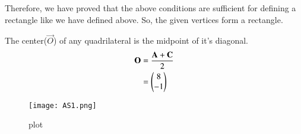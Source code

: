 \documentclass[journal,12pt,twocolumn]{IEEEtran}
\begin{document}
Therefore, we have proved that the above conditions are sufficient for defining a rectangle like we have defined above.
So, the given vertices form a rectangle.

The center($\vec{O}$) of any quadrilateral is the midpoint of it's diagonal. 
\begin{align}
    \mathbf{O} &= \frac{\mathbf{A}+ \mathbf{C}}{2}\\
    &= \begin{pmatrix}8 \\ -1\end{pmatrix}
\end{align}

\begin{figure}[htp]
    \centering
    \texttt{[image: AS1.png]}
    \caption{plot}
    \label{fig:my_label}
\end{figure}
\end{document}

